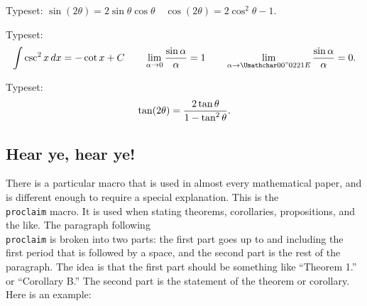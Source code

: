 

\exercise Typeset: $\sin(2\theta) = 2\sin\theta\cos\theta \quad 
\cos(2\theta) = 2\cos^2\theta - 1  $. 

\exercise Typeset: $$\int \csc^2x\, dx = -\cot x+ C 
\qquad \lim_{\alpha\to 0} {\sin\alpha \over \alpha} = 1 
\qquad \lim_{\alpha\to \infty} {\sin\alpha \over \alpha} = 0.$$ 

\exercise Typeset: $$\tan(2\theta) = {2\tan\theta \over 
1-\tan^2\theta}.$$ 


\subsection{Hear ye, hear ye!} 

There is a particular macro that is used in almost every 
mathematical paper, and is different enough to require a special 
explanation. This is the {\tt \\proclaim} macro.  It is used when 
stating theorems, corollaries, propositions, and the like.  The 
paragraph following {\tt \\proclaim} is broken into two parts: 
the first part goes up to and including the first period that is 
followed by a space, and the second part is the rest of the 
paragraph. The idea is that the first part 
should be something like ``Theorem 1.'' or ``Corollary B.'' The 
second part is the statement of the theorem or corollary.  Here 
is an example: 

